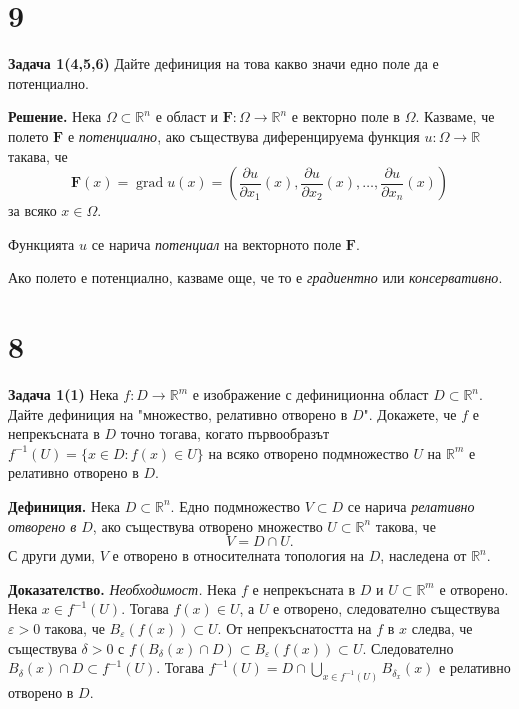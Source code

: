 \documentclass[10pt]{article}
\begin{document}
\section*{9}

\textbf{Задача 1(4,5,6) }Дайте дефиниция на това какво значи едно поле да е потенциално.

\textbf{Решение. }Нека $\Omega \subset \mathbb{R}^n$ е област и $\mathbf{F} : \Omega \to \mathbb{R}^n$ е векторно поле в $\Omega$. 
Казваме, че полето $\mathbf{F}$ е \textit{потенциално}, ако съществува диференцируема функция 
$u : \Omega \to \mathbb{R}$ такава, че
\[
\mathbf{F}(x) = \operatorname{grad} u(x) = \left( \frac{\partial u}{\partial x_1}(x), \frac{\partial u}{\partial x_2}(x), \dots, \frac{\partial u}{\partial x_n}(x) \right)
\]
за всяко $x \in \Omega$.

\vspace{0.2cm}
\noindent
Функцията $u$ се нарича \textit{потенциал} на векторното поле $\mathbf{F}$.

\vspace{0.2cm}
\noindent
Ако полето е потенциално, казваме още, че то е \textit{градиентно} или \textit{консервативно}.

\section*{8}

\textbf{Задача 1(1) }Нека $f : D \to \mathbb{R}^m$ е изображение с дефиниционна област $D \subset \mathbb{R}^n$. Дайте дефиниция на "множество, релативно отворено в $D$". Докажете, че $f$ е непрекъсната в $D$ точно тогава, когато първообразът $f^{-1}(U) = \{x\in D: f(x)\in U\}$ на всяко отворено подмножество $U$ на $\mathbb{R}^m$ е релативно отворено в $D$.

\textbf{Дефиниция. }Нека $D \subset \mathbb{R}^n$. Едно подмножество $V \subset D$ се нарича \textit{релативно отворено в $D$}, 
ако съществува отворено множество $U \subset \mathbb{R}^n$ такова, че
\[
V = D \cap U.
\]
С други думи, $V$ е отворено в относителната топология на $D$, наследена от $\mathbb{R}^n$.


\textbf{Доказателство.}
\textit{Необходимост.} Нека $f$ е непрекъсната в $D$ и $U \subset \mathbb{R}^m$ е отворено.  
Нека $x \in f^{-1}(U)$. Тогава $f(x) \in U$, а $U$ е отворено, следователно съществува $\varepsilon > 0$ такова, че
$B_\varepsilon(f(x)) \subset U$.  
От непрекъснатостта на $f$ в $x$ следва, че съществува $\delta > 0$ с 
$f(B_\delta(x) \cap D) \subset B_\varepsilon(f(x)) \subset U$.  
Следователно $B_\delta(x) \cap D \subset f^{-1}(U)$.  
Тогава $f^{-1}(U) = D \cap \bigcup_{x \in f^{-1}(U)} B_{\delta_x}(x)$ е релативно отворено в $D$.
\end{document}
